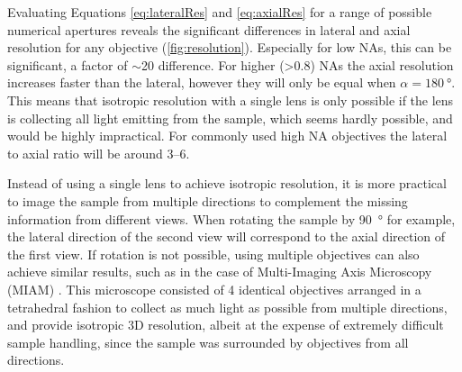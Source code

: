   Evaluating Equations \ref{eq:lateralRes} and \ref{eq:axialRes} for a range of possible numerical apertures reveals the significant differences in lateral and axial resolution for any objective (\autoref{fig:resolution}). Especially for low NAs, this can be significant, a factor of $\sim$20 difference. For higher (>0.8) NAs the axial resolution increases faster than the lateral, however they will only be equal when $\alpha=\SI{180}{\degree}$. This means that isotropic resolution with a single lens is only possible if the lens is collecting all light emitting from the sample, which seems hardly possible, and would be highly impractical. For commonly used high NA objectives the lateral to axial ratio will be around 3--6. 

  Instead of using a single lens to achieve isotropic resolution, it is more practical to image the sample from multiple directions to complement the missing information from different views. When rotating the sample by \SI{90}{\degree} for example, the lateral direction of the second view will correspond to the axial direction of the first view. If rotation is not possible, using multiple objectives can also achieve similar results, such as in the case of Multi-Imaging Axis Microscopy (MIAM) \cite{swoger_multiple_2003,swoger_multi-view_2007}. This microscope consisted of 4 identical objectives arranged in a tetrahedral fashion to collect as much light as possible from multiple directions, and provide isotropic 3D resolution, albeit at the expense of extremely difficult sample handling, since the sample was surrounded by objectives from all directions. 






                                                              

